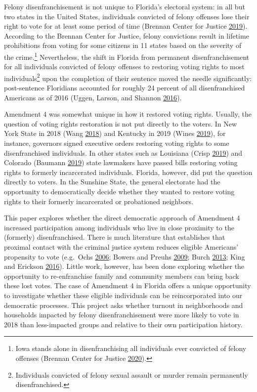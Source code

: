 \documentclass[
  12pt,
]{article}
\begin{document}
Felony disenfranchisement is not unique to Florida's electoral system: in all but two states in the United States, individuals convicted of felony offenses lose their right to vote for at least some period of time (Brennan Center for Justice \protect\hyperlink{ref-bcj_laws}{2019}). According to the Brennan Center for Justice, felony convictions result in lifetime prohibitions from voting for some citizens in 11 states based on the severity of the crime.\footnote{Iowa stands alone in disenfranchising all individuals ever convicted of felony offenses (Brennan Center for Justice \protect\hyperlink{ref-bcj_iowa}{2020}).} Nevertheless, the shift in Florida from permanent disenfranchisement for all individuals convicted of felony offenses to restoring voting rights to most individuals\footnote{Individuals convicted of felony sexual assault or murder remain permanently disenfranchised.} upon the completion of their sentence moved the needle significantly: post-sentence Floridians accounted for roughly 24 percent of all disenfranchised Americans as of 2016 (Uggen, Larson, and Shannon \protect\hyperlink{ref-sentencing_2016}{2016}).

Amendment 4 was somewhat unique in how it restored voting rights. Usually, the question of voting rights restoration is not put directly to the voters. In New York State in 2018 (Wang \protect\hyperlink{ref-Wang2018}{2018}) and Kentucky in 2019 (Wines \protect\hyperlink{ref-Wines2019}{2019}), for instance, governors signed executive orders restoring voting rights to some disenfranchised individuals. In other states such as Louisiana (Crisp \protect\hyperlink{ref-Crisp2019}{2019}) and Colorado (Baumann \protect\hyperlink{ref-Baumann2019}{2019}) state lawmakers have passed bills restoring voting rights to formerly incarcerated individuals. Florida, however, did put the question directly to voters. In the Sunshine State, the general electorate had the opportunity to democratically decide whether they wanted to restore voting rights to their formerly incarcerated or probationed neighbors.

This paper explores whether the direct democratic approach of Amendment 4 increased participation among individuals who live in close proximity to the (formerly) disenfranchised. There is much literature that establishes that proximal contact with the criminal justice system reduces eligible Americans' propensity to vote (e.g.~Ochs \protect\hyperlink{ref-Ochs2006}{2006}; Bowers and Preuhs \protect\hyperlink{ref-Bowers2009}{2009}; Burch \protect\hyperlink{ref-Burch2013}{2013}; King and Erickson \protect\hyperlink{ref-King2016}{2016}). Little work, however, has been done exploring whether the opportunity to re-enfranchise family and community members can bring back these lost votes. The case of Amendment 4 in Florida offers a unique opportunity to investigate whether these eligible individuals can be reincorporated into our democratic processes. This project asks whether turnout in neighborhoods and households impacted by felony disenfranchisement were more likely to vote in 2018 than less-impacted groups and relative to their own participation history.
\end{document}
